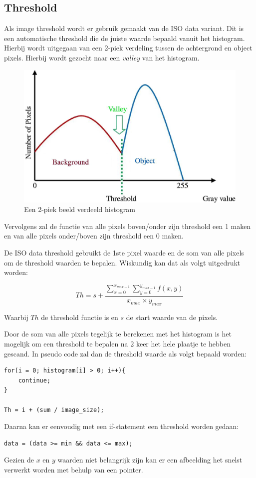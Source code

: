 \subsection{Threshold}

Als image threshold wordt er gebruik gemaakt van de ISO data variant. Dit is een
automatische threshold die de juiste waarde bepaald vanuit het histogram. Hierbij
wordt uitgegaan van een 2-piek verdeling tussen de achtergrond en object pixels.
Hierbij wordt gezocht naar een \emph{valley} van het histogram.

\begin{figure}
    \begin{center}
        \includegraphics[scale=0.35]{figures/histogram.png}
    \end{center}
    \caption{Een 2-piek beeld verdeeld histogram}
    \label{fig:histogram}
\end{figure}

Vervolgens zal de functie van alle pixels boven/onder zijn threshold een 1 maken
en van alle pixels onder/boven zijn threshold een 0 maken.

De ISO data threshold gebruikt de 1ste pixel waarde en de som van alle pixels om
de threshold waarden te bepalen. Wiskundig kan dat als volgt uitgedrukt worden:

\[ Th = s + \frac{\sum\limits_{x=0}^{x_{max-1}} \sum\limits_{y=0}^{y_{max-1}} f(x, y)}{x_{max} \times y_{max}} \]

Waarbij $Th$ de threshold functie is en $s$ de start waarde van de pixels.

Door de som van alle pixels tegelijk te berekenen met het histogram is het
mogelijk om een threshold te bepalen na 2 keer het hele plaatje te hebben
gescand. In pseudo code zal dan de threshold waarde als volgt bepaald worden:

\begin{verbatim}
for(i = 0; histogram[i] > 0; i++){
    continue;
}

Th = i + (sum / image_size);
\end{verbatim}

Daarna  kan er eenvoudig met een if-statement een threshold worden gedaan:

\begin{verbatim}
data = (data >= min && data <= max);
\end{verbatim}

Gezien de $x$ en $y$ waarden niet belangrijk zijn kan er een afbeelding het
snelst verwerkt worden met behulp van een pointer.
